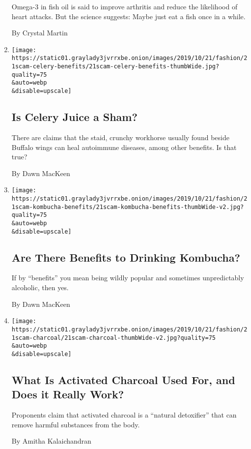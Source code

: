 \begin{enumerate}
  Omega-3 in fish oil is said to improve arthritis and reduce the
  likelihood of heart attacks. But the science suggests: Maybe just eat
  a fish once in a while.

  By Crystal Martin
\item
  \href{/2019/10/16/style/self-care/celery-juice-benefits.html}{}

  \texttt{[image: https://static01.graylady3jvrrxbe.onion/images/2019/10/21/fashion/21scam-celery-benefits/21scam-celery-benefits-thumbWide.jpg?quality=75\\\&auto=webp\\\&disable=upscale]}

  \hypertarget{is-celery-juice-a-sham}{%
  \subsection{Is Celery Juice a Sham?}\label{is-celery-juice-a-sham}}

  There are claims that the staid, crunchy workhorse usually found
  beside Buffalo wings can heal autoimmune diseases, among other
  benefits. Is that true?

  By Dawn MacKeen
\item
  \href{/2019/10/16/style/self-care/kombucha-benefits.html}{}

  \texttt{[image: https://static01.graylady3jvrrxbe.onion/images/2019/10/21/fashion/21scam-kombucha-benefits/21scam-kombucha-benefits-thumbWide-v2.jpg?quality=75\\\&auto=webp\\\&disable=upscale]}

  \hypertarget{are-there-benefits-to-drinking-kombucha}{%
  \subsection{Are There Benefits to Drinking
  Kombucha?}\label{are-there-benefits-to-drinking-kombucha}}

  If by ``benefits'' you mean being wildly popular and sometimes
  unpredictably alcoholic, then yes.

  By Dawn MacKeen
\item
  \href{/2019/10/16/style/self-care/activated-charcoal-benefits.html}{}

  \texttt{[image: https://static01.graylady3jvrrxbe.onion/images/2019/10/21/fashion/21scam-charcoal/21scam-charcoal-thumbWide-v2.jpg?quality=75\\\&auto=webp\\\&disable=upscale]}

  \hypertarget{what-is-activated-charcoal-used-for-and-does-it-really-work}{%
  \subsection{What Is Activated Charcoal Used For, and Does it Really
  Work?}\label{what-is-activated-charcoal-used-for-and-does-it-really-work}}

  Proponents claim that activated charcoal is a ``natural detoxifier''
  that can remove harmful substances from the body.

  By Amitha Kalaichandran
\end{enumerate}

